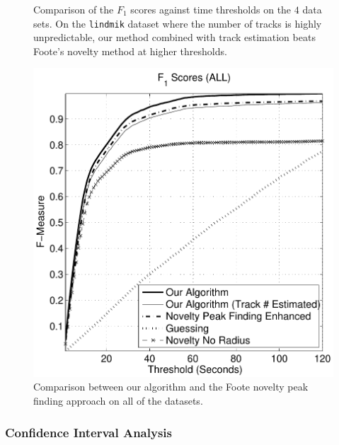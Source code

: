 \documentclass[twocolumn]{article}
\begin{document}
\begin{figure}
\begin{center}
	\end{center}
	
	\caption{Comparison of the $F_1$ scores against time thresholds on the $4$ data sets. On the \texttt{lindmik} dataset where the number of tracks is highly unpredictable, our method combined with track estimation beats Foote's novelty method at higher thresholds.}
	\label{fig:fscores_breakdown}
		
\end{figure}


\begin{figure}
	
		\begin{center}
			\includegraphics[scale=0.5]{images/fscores/fall}
		\end{center}

	\caption{Comparison between our algorithm and the Foote novelty peak finding approach on all of the datasets.}
	\label{fig:fscores_best}
	
\end{figure}

\subsubsection{Confidence Interval Analysis}
\end{document}
